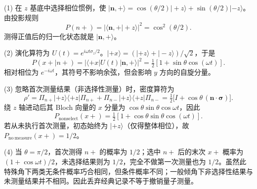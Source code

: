 (1) 在 \(z\) 基底中选择相位惯例，使 \(|\boldsymbol n,+\rangle=\cos(\theta/2)|+z\rangle+\sin(\theta/2)|-z\rangle\)。由投影规则
\[
P(n+)=|\langle\boldsymbol n,+|+z\rangle|^2=\cos^2(\theta/2).
\]
测得正值后的归一化状态就是 \(|\boldsymbol n,+\rangle\)。

(2) 演化算符为 \(U(t)=e^{i\omega t\sigma_z/2}\)。\(|+x\rangle=(|+z\rangle+|-z\rangle)/\sqrt2\)，于是
\[
P(x+\mid n+)=|\langle+x|U(t)|\boldsymbol n,+\rangle|^2
=\tfrac12[1+\sin\theta\cos(\omega t)].
\]
相对相位为 \(e^{-i\omega t}\)，其符号不影响余弦，但会影响 \(y\) 方向的自旋分量。

(3) 忽略首次测量结果（非选择性测量）时，密度算符为
\[
\rho'=\Pi_{n+}|+z\rangle\langle+z|\Pi_{n+}
+\Pi_{n-}|+z\rangle\langle+z|\Pi_{n-}
=\tfrac12\bigl[I+\cos\theta\,(\boldsymbol n\cdot\boldsymbol\sigma)\bigr].
\]
绕 \(z\) 轴进动后其 Bloch 向量的 \(x\) 分量为 \(\cos\theta\sin\theta\cos\omega t\)，因此
\[
P_{\mathrm{nonselect}}(x+)=\tfrac12[1+\cos\theta\sin\theta\cos(\omega t)].
\]
若从未执行首次测量，初态始终为 \(|+z\rangle\)（仅得整体相位），故 \(P_{\mathrm{no\ measure}}(x+)=1/2\)。

(4) 当 \(\theta=\pi/2\)，首次测得 \(n+\) 的概率为 \(1/2\)；选中 \(n+\) 后的末次 \(x+\) 概率为 \((1+\cos\omega t)/2\)，未选择结果则为 \(1/2\)，完全不做第一次测量也为 \(1/2\)。虽然此特殊角下两类无条件概率巧合相同，但条件概率不同；一般倾角下非选择性结果与未测量结果并不相同。因此丢弃经典记录不等于撤销量子测量。

